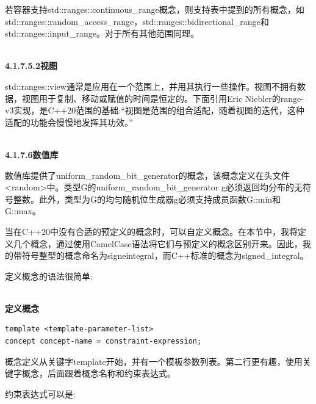若容器支持std::ranges::continuous\_range概念，则支持表中提到的所有概念，如std::ranges::random\_access\_range，std::ranges::bidirectional\_range和std::ranges::input\_range。对于所有其他范围同理。

\hspace*{\fill} \\ %
\noindent
\textbf{4.1.7.5.2\hspace{0.2cm}视图}

std::ranges::view通常是应用在一个范围上，并用其执行一些操作。视图不拥有数据，视图用于复制、移动或赋值的时间是恒定的。下面引用Eric Niebler的range-v3实现，是C++20范围的基础:“视图是范围的组合适配，随着视图的迭代，这种适配的功能会慢慢地发挥其功效。”

\hspace*{\fill} \\ %
\noindent
\textbf{4.1.7.6\hspace{0.2cm}数值库}

数值库提供了uniform\_random\_bit\_generator的概念，该概念定义在头文件<random>中。类型G的uniform\_random\_bit\_generator g必须返回均分布的无符号整数。此外，类型为G的均匀随机位生成器g必须支持成员函数G::min和G::max。


当在C++20中没有合适的预定义的概念时，可以自定义概念。在本节中，我将定义几个概念，通过使用CamelCase语法将它们与预定义的概念区别开来。因此，我的带符号整型的概念命名为signeintegral，而C++标准的概念为signed\_integral。

定义概念的语法很简单:

\hspace*{\fill} \\ %
\noindent
\textbf{定义概念}
\begin{lstlisting}[style=styleCXX]
template <template-parameter-list>
concept concept-name = constraint-expression;
\end{lstlisting}

概念定义从关键字template开始，并有一个模板参数列表。第二行更有趣，使用关键字概念，后面跟着概念名称和约束表达式。

约束表达式可以是:

